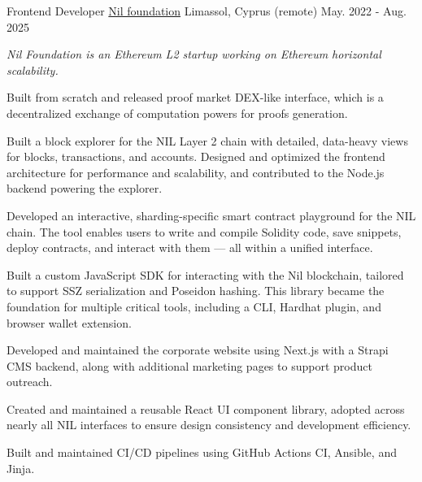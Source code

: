 \begin{cventries}
  \cventry
    {Frontend Developer} %
    {\href{https://nil.foundation}{Nil foundation}} %
    {Limassol, Cyprus (remote)} %
    {May. 2022 - Aug. 2025} %
    {
      \begin{cvitems} %
      \vspace{8pt}
      \item[] {\small\textit{Nil Foundation is an Ethereum L2 startup working on Ethereum horizontal scalability.}}
      \vspace{8pt}
        \item {Built from scratch and released proof market DEX-like interface, which is a decentralized exchange of computation powers for proofs generation.}
        \item {Built a block explorer for the NIL Layer 2 chain with detailed, data-heavy views for blocks, transactions, and accounts. Designed and optimized the frontend architecture for performance and scalability, and contributed to the Node.js backend powering the explorer.}
        \item {Developed an interactive, sharding-specific smart contract playground for the NIL chain. The tool enables users to write and compile Solidity code, save snippets, deploy contracts, and interact with them — all within a unified interface.}
        \item {Built a custom JavaScript SDK for interacting with the Nil blockchain, tailored to support SSZ serialization and Poseidon hashing. This library became the foundation for multiple critical tools, including a CLI, Hardhat plugin, and browser wallet extension.}
        \item {Developed and maintained the corporate website using Next.js with a Strapi CMS backend, along with additional marketing pages to support product outreach.}
        \item {Created and maintained a reusable React UI component library, adopted across nearly all NIL interfaces to ensure design consistency and development efficiency.}
        \item {Built and maintained CI/CD pipelines using GitHub Actions CI, Ansible, and Jinja.}
      \end{cvitems}
    }
    {\vspace{24pt}}


\end{cventries}
